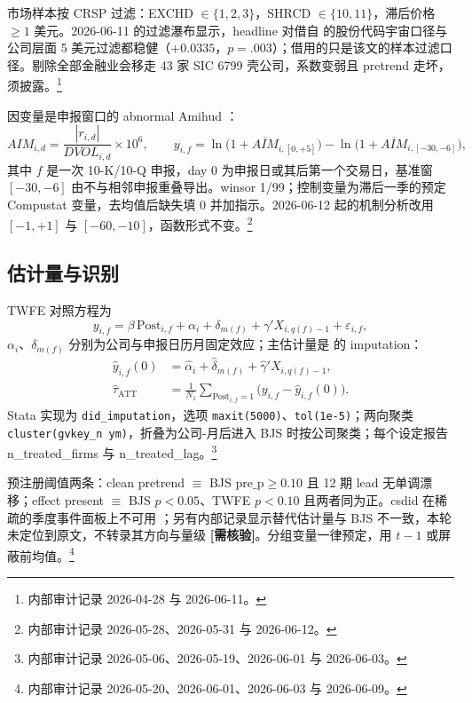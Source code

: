 \documentclass[a4paper,11pt]{ctexart}
\begin{document}
市场样本按 CRSP 过滤：EXCHD $\in\{1,2,3\}$，SHRCD $\in\{10,11\}$，滞后价格 $\geq 1$ 美元。2026-06-11 的过滤瀑布显示，headline 对借自 \citet{changljungqvisttseng2023} 的股份代码宇宙口径与公司层面 5 美元过滤都稳健（$+0.0335$，$p=.003$）；借用的只是该文的样本过滤口径。剔除全部金融业会移走 43 家 SIC 6799 壳公司，系数变弱且 pretrend 走坏，须披露。\footnote{内部审计记录 2026-04-28 与 2026-06-11。}

因变量是申报窗口的 abnormal Amihud \citep{amihud2002,goyenkoholdentrzcinka2009}：
\begin{equation}\label{eq:02-aim}
AIM_{i,d}=\frac{|r_{i,d}|}{DVOL_{i,d}}\times 10^{6},\qquad
y_{i,f}=\ln\bigl(1+\overline{AIM}_{i,[0,+5]}\bigr)-\ln\bigl(1+\overline{AIM}_{i,[-30,-6]}\bigr),
\end{equation}
其中 $f$ 是一次 10-K/10-Q 申报，day 0 为申报日或其后第一个交易日，基准窗 $[-30,-6]$ 由不与相邻申报重叠导出。winsor 1/99；控制变量为滞后一季的预定 Compustat 变量，去均值后缺失填 0 并加指示。2026-06-12 起的机制分析改用 $[-1,+1]$ 与 $[-60,-10]$，函数形式不变。\footnote{内部审计记录 2026-05-28、2026-05-31 与 2026-06-12。}

\subsection{估计量与识别}\label{sec:02-estimator}

TWFE 对照方程为
\begin{equation}\label{eq:02-twfe}
y_{i,f}=\beta\,\mathrm{Post}_{i,f}+\alpha_i+\delta_{m(f)}+\gamma' X_{i,q(f)-1}+\varepsilon_{i,f},
\end{equation}
$\alpha_i$、$\delta_{m(f)}$ 分别为公司与申报日历月固定效应；主估计量是 \citet{borusyakjaravelspiess2024} 的 imputation：
\begin{align}
\hat y_{i,f}(0)&=\hat\alpha_i+\hat\delta_{m(f)}+\hat\gamma' X_{i,q(f)-1},\label{eq:02-bjs-impute}\\
\hat\tau_{\mathrm{ATT}}&=\frac{1}{N_1}\sum_{\mathrm{Post}_{i,f}=1}\bigl(y_{i,f}-\hat y_{i,f}(0)\bigr).\label{eq:02-bjs-att}
\end{align}
Stata 实现为 \texttt{did\_imputation}，选项 \texttt{maxit(5000)}、\texttt{tol(1e-5)}；两向聚类 \texttt{cluster(gvkey\_n ym)}，折叠为公司-月后进入 BJS 时按公司聚类；每个设定报告 n\_treated\_firms 与 n\_treated\_lag。\footnote{内部审计记录 2026-05-06、2026-05-19、2026-06-01 与 2026-06-03。}

预注册阈值两条：clean pretrend $\equiv$ BJS $\mathrm{pre\_p}\geq 0.10$ 且 12 期 lead 无单调漂移；effect present $\equiv$ BJS $p<0.05$、TWFE $p<0.10$ 且两者同为正。csdid 在稀疏的季度事件面板上不可用 \citep{callawaysantanna2021}；另有内部记录显示替代估计量与 BJS 不一致，本轮未定位到原文，不转录其方向与量级 \textbf{[需核验]}。分组变量一律预定，用 $t-1$ 或屏蔽前均值。\footnote{内部审计记录 2026-05-20、2026-06-01、2026-06-03 与 2026-06-09。}
\end{document}
